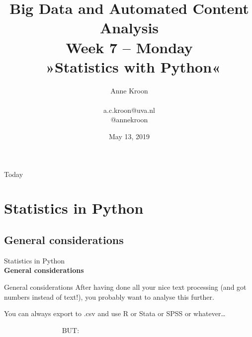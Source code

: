 \documentclass{beamer}
\begin{document}
\title[Big Data and Automated Content Analysis]{\textbf{Big Data and Automated Content Analysis} \\ Week 7 -- Monday \\ \ »Statistics with Python«}
\author[Anne Kroon]{Anne Kroon \\ ~ \\ \footnotesize{a.c.kroon@uva.nl \\@annekroon} \\}
\date{May 13, 2019}


\begin{frame}
\titlepage
\end{frame}

\begin{frame}{Today}
\tableofcontents
\end{frame}



\section{Statistics in Python}
\subsection{General considerations}

\begin{frame}[plain]
Statistics in Python\\
\textbf{General considerations}
\end{frame}

\begin{frame}{General considerations}
After having done all your nice text processing (and got numbers instead of text!), you probably want to analyse this further.

You can always export to .csv and use R or Stata or SPSS or whatever\ldots

\vspace{1cm}
\pause

~~~~~~~~~~~~~~~~ \Huge{BUT:}
\end{frame}
\end{document}
